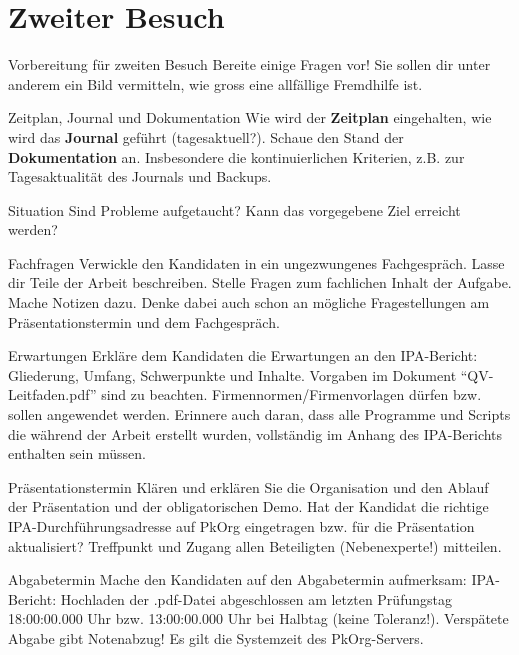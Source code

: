 \chapter{Zweiter Besuch}
\begin{taskitem}{Vorbereitung für zweiten Besuch}
  Bereite einige Fragen vor! Sie sollen dir unter anderem ein Bild vermitteln, wie gross eine allfällige Fremdhilfe ist.
\end{taskitem}
\begin{taskitem}{Zeitplan, Journal und Dokumentation}
  Wie wird der \textbf{Zeitplan} eingehalten, wie wird das \textbf{Journal} geführt (tagesaktuell?). Schaue den Stand der \textbf{Dokumentation} an. Insbesondere die kontinuierlichen Kriterien, z.B. zur Tagesaktualität des Journals und Backups.
\end{taskitem}
\begin{taskitem}{Situation}
  Sind Probleme aufgetaucht? Kann das vorgegebene Ziel erreicht werden?
\end{taskitem}
\begin{taskitem}{Fachfragen}
  Verwickle den Kandidaten in ein ungezwungenes Fachgespräch. Lasse dir Teile der Arbeit beschreiben. Stelle Fragen zum fachlichen Inhalt der Aufgabe. Mache Notizen dazu. Denke dabei auch schon an mögliche Fragestellungen am Präsentationstermin und dem Fachgespräch.
\end{taskitem}
\begin{taskitem}{Erwartungen}
  Erkläre dem Kandidaten die Erwartungen an den IPA-Bericht: Gliederung, Umfang, Schwerpunkte und Inhalte. Vorgaben im Dokument \enquote{QV-Leitfaden.pdf} sind zu beachten. Firmennormen/Firmenvorlagen dürfen bzw. sollen angewendet werden. Erinnere auch daran, dass alle Programme und Scripts die während der Arbeit erstellt wurden, vollständig im Anhang des IPA-Berichts enthalten sein müssen.
\end{taskitem}
\begin{taskitem}{Präsentationstermin}
  Klären und erklären Sie die Organisation und den Ablauf der Präsentation und der obligatorischen Demo. Hat der Kandidat die richtige IPA-Durchführungsadresse auf PkOrg eingetragen bzw. für die Präsentation aktualisiert? Treffpunkt und Zugang allen Beteiligten (Nebenexperte!) mitteilen.
\end{taskitem}
\begin{taskitem}{Abgabetermin}
  Mache den Kandidaten auf den Abgabetermin aufmerksam: IPA-Bericht: Hochladen der .pdf-Datei abgeschlossen am letzten Prüfungstag 18:00:00.000 Uhr bzw. 13:00:00.000 Uhr bei Halbtag (keine Toleranz!). Verspätete Abgabe gibt Notenabzug! Es gilt die Systemzeit des PkOrg-Servers.
\end{taskitem}
